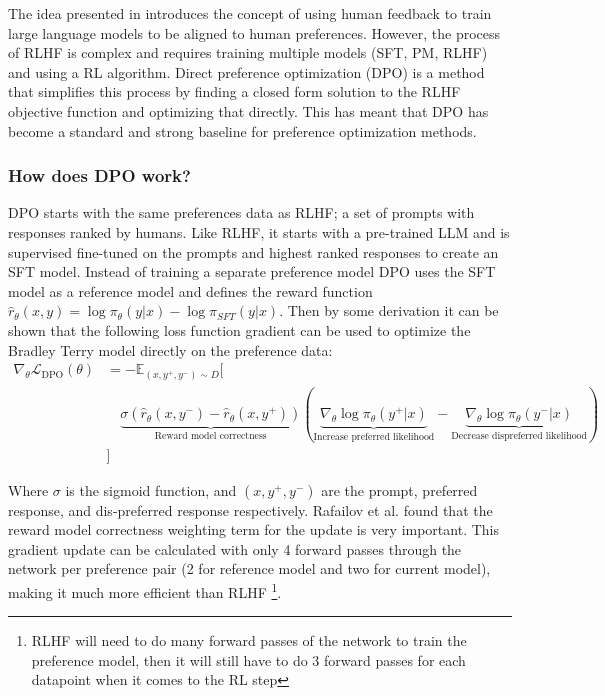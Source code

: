The idea presented in \cite{ouyangTrainingLanguageModels2022} introduces the concept of using human feedback to train large language models to be aligned to human preferences. However, the process of RLHF is complex and requires training multiple models (SFT, PM, RLHF) and using a RL algorithm. Direct preference optimization (DPO) \cite{rafailovDirectPreferenceOptimization2024} is a method that simplifies this process by finding a closed form solution to the RLHF objective function and optimizing that directly. This has meant that DPO has become a standard and strong baseline for preference optimization methods.

\subsubsection{How does DPO work?}

DPO starts with the same preferences data as RLHF; a set of prompts with responses ranked by humans. Like RLHF, it starts with a pre-trained LLM and is supervised fine-tuned on the prompts and highest ranked responses to create an SFT model. Instead of training a separate preference model DPO uses the SFT model as a reference model and defines the reward function $\hat{r}_\theta(x,y) = \log \pi_\theta(y|x) - \log \pi_{SFT}(y|x)$. Then by some derivation \cite{rafailovDirectPreferenceOptimization2024} it can be shown that the following loss function gradient can be used to optimize the Bradley Terry model directly on the preference data:
\begin{equation*}
\begin{aligned}
\nabla_\theta \mathcal{L}_{\mathrm{DPO}}(\theta)
&= -\mathbb{E}_{(x, y^+, y^-) \sim D} \big[ \\
&\quad
\underbrace{
\sigma \!\left(
\hat{r}_\theta(x,y^-)
-
\hat{r}_\theta(x,y^+)
\right)
}_{\text{Reward model correctness}}
\left(
\underbrace{
\nabla_\theta \log \pi_\theta(y^+|x)
}_{\text{Increase preferred likelihood}}
-
\underbrace{
\nabla_\theta \log \pi_\theta(y^-|x)
}_{\text{Decrease dispreferred likelihood}}
\right)\\
&\big]
\end{aligned}
\end{equation*}

\noindent Where $\sigma$ is the sigmoid function, and $(x, y^+, y^-)$ are the prompt, preferred response, and dis-preferred response respectively. Rafailov et al. \cite{rafailovDirectPreferenceOptimization2024} found that the reward model correctness weighting term for the update is very important. This gradient update can be calculated with only 4 forward passes through the network per preference pair (2 for reference model and two for current model), making it much more efficient than RLHF \footnote{RLHF will need to do many forward passes of the network to train the preference model, then it will still have to do 3 forward passes for each datapoint when it comes to the RL step}.

